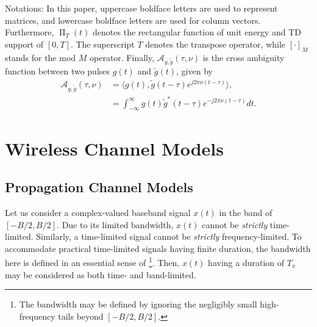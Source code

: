 \documentclass[journal]{IEEEtran}
\DeclareMathOperator{\rect}{\Pi}
\begin{document}
Notations: In this paper, uppercase boldface letters are used to represent matrices, and lowercase boldface letters are used for column vectors. Furthermore, $\rect_ T(t)$ denotes the rectangular function of unit energy and TD support of $[0, T]$.
The superscript $T$ denotes the transpose operator, while $[\cdot]_M$ stands for the mod $M$ operator.
Finally, $\mathcal A_{g,\tilde g}(\tau,\nu)$ is the cross ambiguity function between two pulses $g(t)$ and $\tilde g(t)$, given by
\begin{align*}
  \mathcal A_{g,{\tilde g}}(\tau,\nu) & =   \langle g(t), {\tilde g}(t-\tau)e^{j2\pi \nu (t-\tau)} \rangle,                          \\
                                      & =  \int_{-\infty}^{\infty} g(t) {\tilde g}^{*} (t-\tau)e^{-j2\pi \nu (t-\tau)} dt. \nonumber
\end{align*}

\section{Wireless Channel Models}

\subsection{Propagation Channel Models}
Let us consider a complex-valued baseband signal $x(t)$ in the band of $[-B/2, B/2]$. Due to its limited bandwidth, $x(t)$ cannot be \emph{strictly} time-limited. Similarly, a time-limited signal cannot be \emph{strictly} frequency-limited. To accommodate practical time-limited signals having finite duration, the bandwidth here is defined in an essential sense of \cite{onbandwidth}\footnote{The bandwidth may be defined by ignoring the negligibly small high-frequency tails beyond $[-B/2, B/2]$.}. Then, $x(t)$ having a duration of $T_x$ may be considered as both time- and band-limited.
\end{document}
